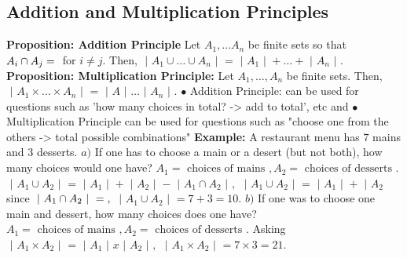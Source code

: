 \documentclass{article}
\begin{document}
\subsection{Addition and Multiplication Principles}
\textbf{Proposition: Addition Principle }
\newline
\newline
Let $A_1, \dots A_n$ be finite sets so that $A_i \cap A_j = \null$ for $i \not = j$.
\newline
Then, $\text{ | } A_1 \cup \dots \cup A_n \text{ | } = \text{ | } A_1 \text{ | } + \dots + \text{ | } A_n \text{ | }.$
\newline
\newline
\textbf{Proposition: Multiplication Principle: }
\newline
Let $A_1, \dots , A_n$ be finite sets. Then,
\newline
$\text{ | } A_1 \times \dots \times A_n \text{ | } = \text{ | } A \text{ | } \dots \text{ | } A_n \text{ | }.$
\newline
\newline
$\bullet $ Addition Principle: can be used for questions such as 'how many choices in total? -> add to total', etc and
\newline
$\bullet $ Multiplication Principle can be used for questions such as "choose one from the others -> total possible combinations"
\newline
\newline
\textbf{Example: }
A restaurant menu has $7$ mains and $3$ desserts.
\newline
\newline
$a) $ If one has to choose a main or a desert (but not both), how many choices would one have?
\newline
\newline
$A_1 = {\text{ choices of mains }}, A_2 = {\text{ choices of desserts }}.$
\newline
$\text{ | } A_1 \cup A_2 \text{ | } = \text{ | } A_1 \text{ | } + \text{ | } A_2 \text{ | } - \text{ | } A_1 \cap A_2 \text{ | },$
\newline
$\text{ | } A_1 \cup A_2 \text{ | } = \text{ | } A_1 \text{ | } + \text{ | } A_2$ since $\text{ | } A_1 \cap A_2 \text{ | } = \null,$
\newline
$\text{ | } A_1 \cup A_2 \text{ | } = 7 + 3 = 10.$
\newline
\newline
$b) $ If one was to choose one main and dessert, how many choices does one have?
\newline
\newline
$A_1 = {\text{ choices of mains }}, A_2 = {\text{ choices of desserts }}.$
\newline
Asking $\text{ | } A_1 \times A_2 \text{ | } = \text{ | } A_1 \text{ | } x \text{ | } A_2 \text{ | },$
\newline
$\text{ | } A_1 \times A_2 \text{ | } = 7 \times 3 = 21.$
\newpage
\end{document}
